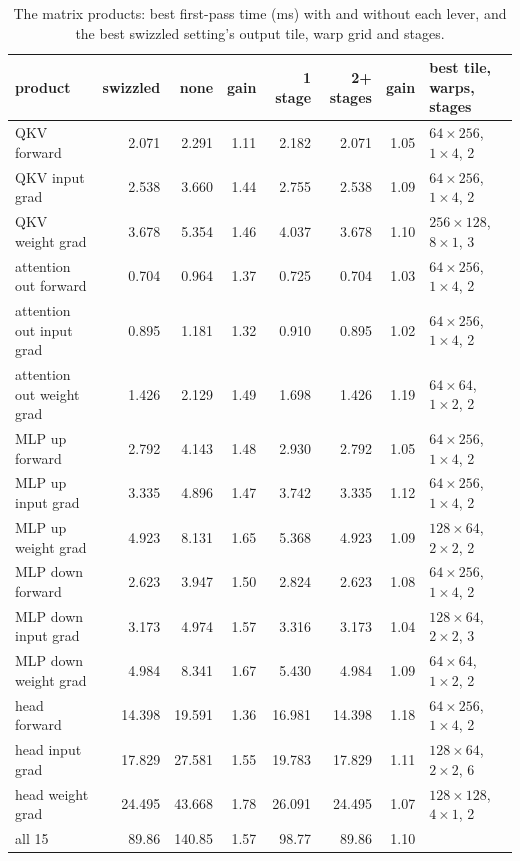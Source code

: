 \documentclass[10pt]{article}
\begin{document}
\begin{table}[h]
  \centering
  \caption{The matrix products: best first-pass time (ms) with and without each lever, and the best swizzled setting's
  output tile, warp grid and stages.}
  \label{tab:products}
  \small
  \begin{tabular}{@{}lrrrrrrl@{}}
    \toprule
    product & swizzled & none & gain & 1 stage & 2+ stages & gain & best tile, warps, stages \\
    \midrule
    QKV forward                  &  2.071 &  2.291 & 1.11 &  2.182 &  2.071 & 1.05 & $64\times256$, $1\times4$, 2 \\
    QKV input grad               &  2.538 &  3.660 & 1.44 &  2.755 &  2.538 & 1.09 & $64\times256$, $1\times4$, 2 \\
    QKV weight grad              &  3.678 &  5.354 & 1.46 &  4.037 &  3.678 & 1.10 & $256\times128$, $8\times1$, 3 \\
    attention out forward        &  0.704 &  0.964 & 1.37 &  0.725 &  0.704 & 1.03 & $64\times256$, $1\times4$, 2 \\
    attention out input grad     &  0.895 &  1.181 & 1.32 &  0.910 &  0.895 & 1.02 & $64\times256$, $1\times4$, 2 \\
    attention out weight grad    &  1.426 &  2.129 & 1.49 &  1.698 &  1.426 & 1.19 & $64\times64$, $1\times2$, 2 \\
    MLP up forward               &  2.792 &  4.143 & 1.48 &  2.930 &  2.792 & 1.05 & $64\times256$, $1\times4$, 2 \\
    MLP up input grad            &  3.335 &  4.896 & 1.47 &  3.742 &  3.335 & 1.12 & $64\times256$, $1\times4$, 2 \\
    MLP up weight grad           &  4.923 &  8.131 & 1.65 &  5.368 &  4.923 & 1.09 & $128\times64$, $2\times2$, 2 \\
    MLP down forward             &  2.623 &  3.947 & 1.50 &  2.824 &  2.623 & 1.08 & $64\times256$, $1\times4$, 2 \\
    MLP down input grad          &  3.173 &  4.974 & 1.57 &  3.316 &  3.173 & 1.04 & $128\times64$, $2\times2$, 3 \\
    MLP down weight grad         &  4.984 &  8.341 & 1.67 &  5.430 &  4.984 & 1.09 & $64\times64$, $1\times2$, 2 \\
    head forward                 & 14.398 & 19.591 & 1.36 & 16.981 & 14.398 & 1.18 & $64\times256$, $1\times4$, 2 \\
    head input grad              & 17.829 & 27.581 & 1.55 & 19.783 & 17.829 & 1.11 & $128\times64$, $2\times2$, 6 \\
    head weight grad             & 24.495 & 43.668 & 1.78 & 26.091 & 24.495 & 1.07 & $128\times128$, $4\times1$, 2 \\
    \midrule
    all 15                       & 89.86 & 140.85 & 1.57 & 98.77 & 89.86 & 1.10 & \\
    \bottomrule
  \end{tabular}
\end{table}
\end{document}
